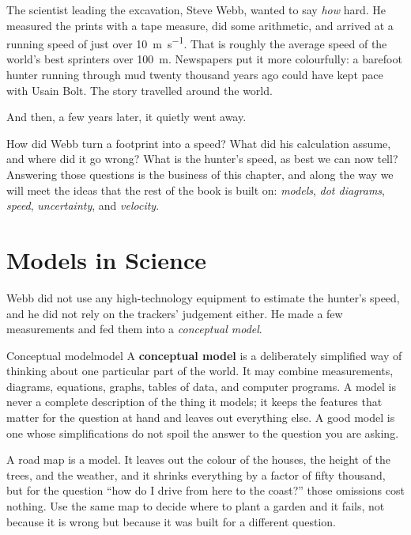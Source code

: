 The scientist leading the excavation, Steve Webb, wanted to say \emph{how} hard. He measured the prints with a tape measure, did some arithmetic, and arrived at a running speed of just over \SI{10}{\metre\per\second}. That is roughly the average speed of the world's best sprinters over \SI{100}{\metre}. Newspapers put it more colourfully: a barefoot hunter running through mud twenty thousand years ago could have kept pace with Usain Bolt. The story travelled around the world.

And then, a few years later, it quietly went away.

How did Webb turn a footprint into a speed? What did his calculation assume, and where did it go wrong? What is the hunter's speed, as best we can now tell? Answering those questions is the business of this chapter, and along the way we will meet the ideas that the rest of the book is built on: \emph{models}, \emph{dot diagrams}, \emph{speed}, \emph{uncertainty}, and \emph{velocity}.

\section{Models in Science}

Webb did not use any high-technology equipment to estimate the hunter's speed, and he did not rely on the trackers' judgement either. He made a few measurements and fed them into a \emph{conceptual model}.

\begin{definition}{Conceptual model}{model}
A \textbf{conceptual model} is a deliberately simplified way of thinking about one particular part of the world. It may combine measurements, diagrams, equations, graphs, tables of data, and computer programs. A model is never a complete description of the thing it models; it keeps the features that matter for the question at hand and leaves out everything else. A good model is one whose simplifications do not spoil the answer to the question you are asking.
\end{definition}

A road map is a model. It leaves out the colour of the houses, the height of the trees, and the weather, and it shrinks everything by a factor of fifty thousand, but for the question ``how do I drive from here to the coast?'' those omissions cost nothing. Use the same map to decide where to plant a garden and it fails, not because it is wrong but because it was built for a different question.

